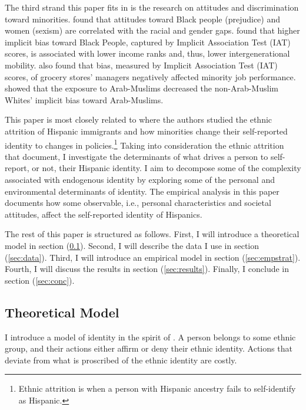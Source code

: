 \documentclass[12pt, fullpage]{article}
\begin{document}
The third strand this paper fits in is the research on attitudes and discrimination toward minorities. \citet{charlesPrejudiceWagesEmpirical2008,charlesEffectsSexismAmerican2018} found that attitudes toward Black people (prejudice) and women (sexism) are correlated with the racial and gender gaps. \citet{chettyRaceEconomicOpportunity2020} found that higher implicit bias toward Black People, captured by Implicit Association Test (IAT) scores, is associated with lower income ranks and, thus, lower intergenerational mobility. \citet{gloverDiscriminationSelfFulfillingProphecy2017} also found that bias, measured by Implicit Association Test (IAT) scores, of grocery stores' managers negatively affected minority job performance. \citet{bursztynImmigrantNextDoor2022} showed that the exposure to Arab-Muslims decreased the non-Arab-Muslim Whites' implicit bias toward Arab-Muslims. 

This paper is most closely related to \citet{antmanEthnicAttritionObserved2016,antmanIncentivesIdentifyRacial2015,antmanAmericanIndianCasinos2021} where the authors studied the ethnic attrition of Hispanic immigrants and how minorities change their self-reported identity to changes in policies.\footnote{Ethnic attrition is when a person with Hispanic ancestry fails to self-identify as Hispanic.} Taking into consideration the ethnic attrition that \citet{antmanEthnicAttritionObserved2016} document, I investigate the determinants of what drives a person to self-report, or not, their Hispanic identity. I aim to decompose some of the complexity associated with endogenous identity by exploring some of the personal and environmental determinants of identity. The empirical analysis in this paper documents how some observable, i.e., personal characteristics and societal attitudes, affect the self-reported identity of Hispanics. 

The rest of this paper is structured as follows. First, I will introduce a theoretical model in section (\ref{sec:model}). Second, I will describe the data I use in section (\ref{sec:data}). Third, I will introduce an empirical model in section (\ref{sec:empstrat}). Fourth, I will discuss the results in section (\ref{sec:results}). Finally, I conclude in section (\ref{sec:conc}). 

\subsection{Theoretical Model}\label{sec:model}

I introduce a model of identity in the spirit of \citet{akerlofEconomicsIdentity2000}. A person belongs to some ethnic group, and their actions either affirm or deny their ethnic identity. Actions that deviate from what is proscribed of the ethnic identity are costly. 
\end{document}
